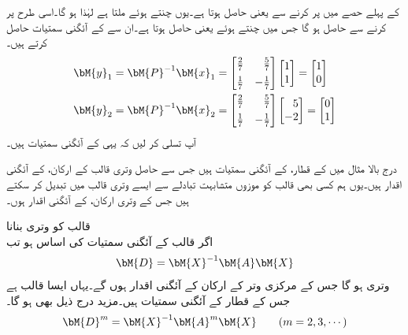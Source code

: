  کے پہلے حصے  میں  پر کرنے سے  یعنی  حاصل ہوتا ہے۔یوں  چنتے ہوئے  ملتا ہے لہٰذا  ہو گا۔اسی طرح  پر کرنے سے  حاصل ہو گا جس میں  چنتے ہوئے  یعنی
  حاصل ہوتا ہے۔ان سے  کے آئگنی سمتیات حاصل کرتے ہیں۔
\begin{align*}
\bM{y}_1&=\bM{P}^{-1}\bM{x}_1=\begin{bmatrix*}[r]\tfrac{2}{7}&\tfrac{5}{7}\\[0.5em] \tfrac{1}{7}&-\tfrac{1}{7}  \end{bmatrix*}\begin{bmatrix*}[r]1\\1 \end{bmatrix*}=\begin{bmatrix*}[r]1\\0 \end{bmatrix*}\\
\bM{y}_2&=\bM{P}^{-1}\bM{x}_2=\begin{bmatrix*}[r]\tfrac{2}{7}&\tfrac{5}{7}\\[0.5em] \tfrac{1}{7}&-\tfrac{1}{7}  \end{bmatrix*}\begin{bmatrix*}[r]5\\-2 \end{bmatrix*}=\begin{bmatrix*}[r]0\\1 \end{bmatrix*}
\end{align*}
آپ تسلی کر لیں کہ یہی  کے آئگنی سمتیات ہیں۔

درج بالا  مثال میں  کے قطار،  کے آئگنی سمتیات ہیں جس سے حاصل وتری  قالب  کے ارکان،  کے آئگنی اقدار ہیں۔یوں ہم کسی بھی قالب  کو موزوں متشابہت تبادلے سے ایسے وتری قالب میں تبدیل کر سکتے ہیں جس کے وتری ارکان،  کے آئگنی اقدار ہوں۔  

\quad قالب کو وتری بنانا\\
اگر  قالب  کے آئگنی سمتیات کی اساس ہو تب
\begin{align}\label{مساوات_آئگنی_وتری_حصول_الف}
\bM{D}=\bM{X}^{-1}\bM{A}\bM{X}
\end{align}
وتری ہو گا جس کے مرکزی وتر کے ارکان  کے آئگنی اقدار ہوں گے۔یہاں  ایسا قالب ہے جس کے قطار  کے  آئگنی سمتیات ہیں۔مزید درج ذیل بھی ہو گا۔
\begin{align}\label{مساوات_آئگنی_وتری_حصول_ب}
\bM{D}^m=\bM{X}^{-1}\bM{A}^m\bM{X}\quad \quad (m=2,3,\cdots)
\end{align}

